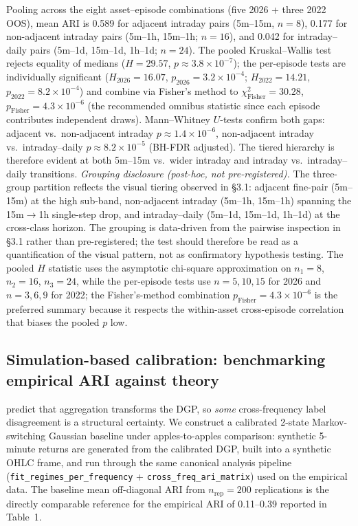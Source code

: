 \documentclass[preprint,12pt,authoryear]{elsarticle}
\begin{document}
Pooling across the eight asset--episode combinations (five 2026 + three 2022 OOS), mean ARI is 0.589 for adjacent intraday pairs (5m--15m, $n=8$), 0.177 for non-adjacent intraday pairs (5m--1h, 15m--1h; $n=16$), and 0.042 for intraday--daily pairs (5m--1d, 15m--1d, 1h--1d; $n=24$). The pooled Kruskal--Wallis test rejects equality of medians ($H = 29.57$, $p \approx 3.8 \times 10^{-7}$); the per-episode tests are individually significant ($H_{2026}=16.07$, $p_{2026}=3.2\times 10^{-4}$; $H_{2022}=14.21$, $p_{2022}=8.2\times 10^{-4}$) and combine via Fisher's method to $\chi^2_{\text{Fisher}}=30.28$, $p_{\text{Fisher}}=4.3\times 10^{-6}$ (the recommended omnibus statistic since each episode contributes independent draws). Mann--Whitney $U$-tests confirm both gaps: adjacent vs.\ non-adjacent intraday $p \approx 1.4 \times 10^{-6}$, non-adjacent intraday vs.\ intraday--daily $p \approx 8.2 \times 10^{-5}$ (BH-FDR adjusted). The tiered hierarchy is therefore evident at both 5m--15m vs.\ wider intraday and intraday vs.\ intraday--daily transitions. \emph{Grouping disclosure (post-hoc, not pre-registered).} The three-group partition reflects the visual tiering observed in \S{}3.1: adjacent fine-pair (5m--15m) at the high sub-band, non-adjacent intraday (5m--1h, 15m--1h) spanning the 15m$\to$1h single-step drop, and intraday--daily (5m--1d, 15m--1d, 1h--1d) at the cross-class horizon. The grouping is data-driven from the pairwise inspection in \S{}3.1 rather than pre-registered; the test should therefore be read as a quantification of the visual pattern, not as confirmatory hypothesis testing. The pooled $H$ statistic uses the asymptotic chi-square approximation on $n_1 = 8$, $n_2 = 16$, $n_3 = 24$, while the per-episode tests use $n=5, 10, 15$ for 2026 and $n=3, 6, 9$ for 2022; the Fisher's-method combination $p_{\text{Fisher}}=4.3\times 10^{-6}$ is the preferred summary because it respects the within-asset cross-episode correlation that biases the pooled $p$ low.

\subsection{Simulation-based calibration: benchmarking empirical ARI against theory}\label{app:rss_sim}

\citet{ChanZhangCheung2009} predict that aggregation transforms the DGP, so \emph{some} cross-frequency label disagreement is a structural certainty. We construct a calibrated 2-state Markov-switching Gaussian baseline under apples-to-apples comparison: synthetic 5-minute returns are generated from the calibrated DGP, built into a synthetic OHLC frame, and run through the same canonical analysis pipeline (\texttt{fit\_regimes\_per\_frequency} + \texttt{cross\_freq\_ari\_matrix}) used on the empirical data. The baseline mean off-diagonal ARI from $n_{\text{rep}}=200$ replications is the directly comparable reference for the empirical ARI of 0.11--0.39 reported in Table~1.
\end{document}
